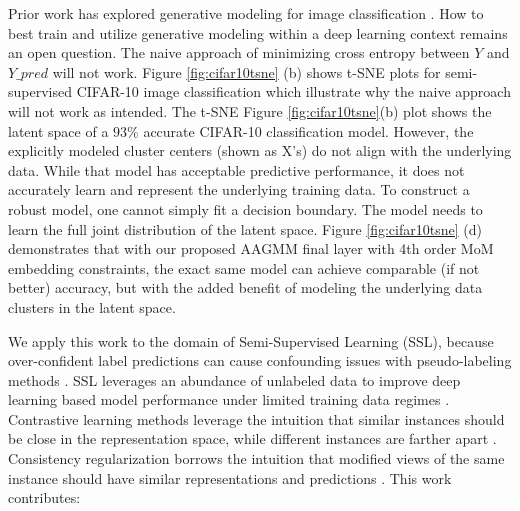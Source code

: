 \documentclass[10pt,twocolumn,letterpaper]{article}
\begin{document}
Prior work has explored generative modeling for image classification \cite{li2019disentangled,kingma2013auto,kingma2019introduction}.
How to best train and utilize generative modeling within a deep learning context remains an open question.
The naive approach of minimizing cross entropy between $Y$ and $Y\_pred$ will not work.
Figure \ref{fig:cifar10tsne} (b) shows t-SNE plots for semi-supervised CIFAR-10 \cite{cifar10} image classification which illustrate why the naive approach will not work as intended. 
The t-SNE \cite{tsne} Figure \ref{fig:cifar10tsne}(b) plot shows the latent space of a $93\%$ accurate CIFAR-10 classification model. 
However, the explicitly modeled cluster centers (shown as X's) do not align with the underlying data.
While that model has acceptable predictive performance, it does not accurately learn and represent the underlying training data.
To construct a robust model, one cannot simply fit a decision boundary.
The model needs to learn the full joint distribution of the latent space. 
Figure \ref{fig:cifar10tsne} (d) demonstrates that with our proposed AAGMM final layer with 4th order MoM embedding constraints, the exact same model can achieve comparable (if not better) accuracy, but with the added benefit of modeling the underlying data clusters in the latent space.


We apply this work to the domain of Semi-Supervised Learning (SSL), because over-confident label predictions can cause confounding issues with pseudo-labeling methods \cite{arazo2020pseudo}.
SSL leverages an abundance of unlabeled data to improve deep learning based model performance under limited training data regimes \cite{zhu2022introduction,li2019safe,hady2013semi}.
Contrastive learning methods leverage the intuition that similar instances should be close in the representation space, while different instances are farther apart \cite{yang2022class,li2021comatch}.
Consistency regularization borrows the intuition that modified views of the same instance should have similar representations and predictions \cite{sohn2020fixmatch,lee2022contrastive,zhang2021flexmatch,kim2022conmatch}.
This work contributes:
\end{document}
